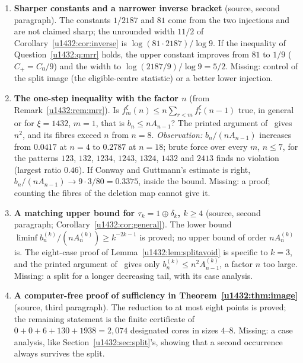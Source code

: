 \documentclass[11pt]{article}
\theoremstyle{remark}\newtheorem{remark}[theorem]{Remark}
\begin{document}
\begin{enumerate}
 Since $A_{n+2}/A_n\to81$, the ratio $b_n/(nA_n)$ converges if and only if
 $E_{n+2}/n$ does, and the value $3/80$ corresponds to $E_{n+2}\sim
 n/2160$. Missing: any law of large numbers for eligible centres.
\item\label{u1432:q:constants} \textbf{Sharper constants and a narrower
 inverse bracket} (source, second paragraph). The constants $1/2187$ and $81$
 come from the two injections and are not claimed sharp; the unrounded width
 $11/2$ of Corollary~\ref{u1432:cor:inverse} is $\log(81\cdot2187)/\log9$.
 If the inequality of Question~\ref{u1432:q:mrr} holds, the upper constant
 improves from $81$ to $1/9$ ($C_+=C_0/9$) and the width to
 $\log(2187/9)/\log9=5/2$.
 Missing: control of the split image (the eligible-centre statistic) or a
 better lower injection.
\item\label{u1432:q:mrr} \textbf{The one-step inequality with the factor
 $n$} (from Remark~\ref{u1432:rem:mrr}). Is $f_m^\xi(n)\le
 n\sum_{r<m}f_r^\xi(n-1)$ true, in general or for $\xi=1432$, $m=1$, that
 is $b_n\le nA_{n-1}$? The printed argument of~\cite{MRR} gives $n^2$, and
 its fibres exceed $n$ from $n=8$. \emph{Observation:} $b_n/(nA_{n-1})$
 increases from $0.0417$ at $n=4$ to $0.2787$ at $n=18$; brute force over
 every $m$, $n\le7$, for the patterns $123$, $132$, $1234$, $1243$, $1324$,
 $1432$ and $2413$ finds no violation (largest ratio $0.46$). If Conway and
 Guttmann's estimate is right, $b_n/(nA_{n-1})\to9\cdot3/80=0.3375$, inside the
 bound. Missing: a proof; counting the fibres of the deletion map cannot
 give it.
\item\label{u1432:q:tau} \textbf{A matching upper bound for
 $\tau_k=1\oplus\delta_k$, $k\ge4$} (source, second paragraph;
 Corollary~\ref{u1432:cor:general}). The lower bound
 $\liminf b^{(k)}_n/(nA^{(k)}_n)\ge k^{-2k-1}$ is proved; no upper bound of
 order $nA^{(k)}_n$ is. The eight-case proof of
 Lemma~\ref{u1432:lem:splitavoid} is specific to $k=3$, and the printed
 argument of~\cite{MRR} gives only $b^{(k)}_n\le n^2A^{(k)}_{n-1}$, a factor
 $n$ too large. Missing: a split for a longer decreasing tail, with its case
 analysis.
\item\label{u1432:q:image} \textbf{A computer-free proof of sufficiency in
 Theorem~\ref{u1432:thm:image}} (source, third paragraph). The reduction to
 at most eight points is proved; the remaining statement is the finite
 certificate of $0+0+6+130+1938=2{,}074$ designated cores in sizes $4$--$8$.
 Missing: a case analysis, like Section~\ref{u1432:sec:split}'s, showing
 that a second occurrence always survives the split.

\end{enumerate}
\end{document}
